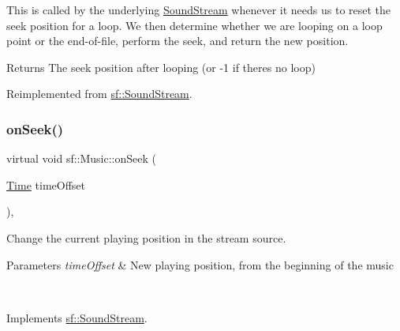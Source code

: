 This is called by the underlying \mbox{\hyperlink{classsf_1_1_sound_stream}{Sound\+Stream}} whenever it needs us to reset the seek position for a loop. We then determine whether we are looping on a loop point or the end-\/of-\/file, perform the seek, and return the new position.

\begin{DoxyReturn}{Returns}
The seek position after looping (or -\/1 if there\textquotesingle{}s no loop) \begin{DoxyVerb}\end{DoxyVerb}
 
\end{DoxyReturn}


Reimplemented from \mbox{\hyperlink{classsf_1_1_sound_stream_a3f717d18846f261fc375d71d6c7e41da}{sf\+::\+Sound\+Stream}}.

\mbox{\label{classsf_1_1_music_a15119cc0419c16bb334fa0698699c02e}} 
\subsubsection{\texorpdfstring{onSeek()}{onSeek()}}
{\footnotesize\ttfamily virtual void sf\+::\+Music\+::on\+Seek (\begin{DoxyParamCaption}\item[{\mbox{\hyperlink{classsf_1_1_time}{Time}}}]{time\+Offset }\end{DoxyParamCaption})\hspace{0.3cm}{\ttfamily [protected]}, {\ttfamily [virtual]}}



Change the current playing position in the stream source. 


\begin{DoxyParams}{Parameters}
{\em time\+Offset} & New playing position, from the beginning of the music \begin{DoxyVerb}\end{DoxyVerb}
 \\
\hline
\end{DoxyParams}


Implements \mbox{\hyperlink{classsf_1_1_sound_stream_a907036dd2ca7d3af5ead316e54b75997}{sf\+::\+Sound\+Stream}}.

\mbox{\label{classsf_1_1_music_a3edc66e5f5b3f11e84b90eaec9c7d7c0}} 
